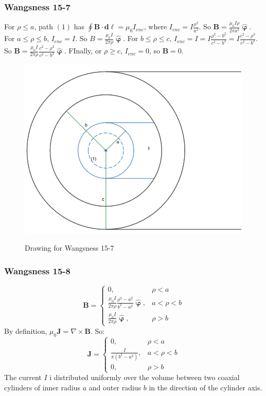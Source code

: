 \documentclass{article}
\theoremstyle{mystyle}
\begin{document}
\subsubsection{Wangsness 15-7}
For $\rho\leq a$, path $(1)$ has $\oint \mathbf{B}\cdot \mathbf{d\ell}= \mu_0 I_{enc}$, where $I_{enc} = I\frac{\rho^2}{a^2}$. So $\mathbf{B} = \frac{\mu_0 I\rho}{2\pi a^2} \hat{\boldsymbol{\upvarphi}}$. For $a\leq \rho \leq b$, $I_{enc} = I$. So $B = \frac{\mu_0 I}{2\pi \rho} \hat{\boldsymbol{\upvarphi}}$. For $b\leq \rho \leq c$, $I_{enc} = I =I\frac{\rho^2-b^2}{c^2-b^2} = I\frac{c^2-\rho^2}{c^2-b^2}$. So $\mathbf{B} = \frac{\mu_0 I}{2\pi \rho} \frac{c^2-\rho^2}{c^2-b^2}\hat{\boldsymbol{\upvarphi}}$. FInally, or $\rho \geq c$, $I_{enc} = 0$, so $\mathbf{B} = 0$.
\begin{figure}[htbp]
    \centering
    {\includegraphics[scale=0.4]{15-7.png}}
    \caption{Drawing for Wangsness 15-7}
\end{figure}
\subsubsection{Wangsness 15-8}
\begin{equation*}
    \mathbf{B} = \begin{cases} 0, & \rho < a \\ \frac{\mu_0 I}{2\pi \rho}\frac{\rho^2-a^2}{b^2-a^2}\hat{\boldsymbol{\upvarphi}}, & a<\rho < b \\ \frac{\mu_0 I}{2\pi \rho} \hat{\boldsymbol{\upvarphi}}, & \rho>b\end{cases}    
\end{equation*}
By definition, $\mu_0 \mathbf{J} = \nabla \times \mathbf{B}$. So:
\begin{equation*}
    \mathbf{J} = \begin{cases} 0, & \rho<a\\ \frac{I}{\pi(b^2-a^2)}, & a<\rho < b\\ 0, & \rho>b \end{cases}    
\end{equation*}
The current $I$ i distributed uniformly over the volume between two coaxial cylinders of inner radius $a$ and outer radius $b$ in the direction of the cylinder axis.
\end{document}
